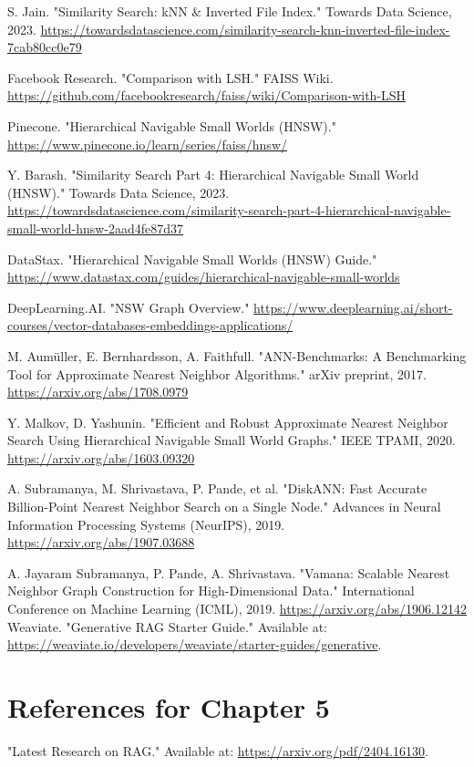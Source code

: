 \documentclass[12pt,a4paper,twoside,openright,justified]{book}
\begin{document}
\begin{thebibliography}{99}
S. Jain. "Similarity Search: kNN & Inverted File Index." Towards Data Science, 2023. \url{https://towardsdatascience.com/similarity-search-knn-inverted-file-index-7cab80cc0e79}

Facebook Research. "Comparison with LSH." FAISS Wiki. \url{https://github.com/facebookresearch/faiss/wiki/Comparison-with-LSH}

Pinecone. "Hierarchical Navigable Small Worlds (HNSW)." \url{https://www.pinecone.io/learn/series/faiss/hnsw/}

Y. Barash. "Similarity Search Part 4: Hierarchical Navigable Small World (HNSW)." Towards Data Science, 2023. \url{https://towardsdatascience.com/similarity-search-part-4-hierarchical-navigable-small-world-hnsw-2aad4fe87d37}

DataStax. "Hierarchical Navigable Small Worlds (HNSW) Guide." \url{https://www.datastax.com/guides/hierarchical-navigable-small-worlds}

DeepLearning.AI. "NSW Graph Overview." \url{https://www.deeplearning.ai/short-courses/vector-databases-embeddings-applications/}

M. Aumüller, E. Bernhardsson, A. Faithfull. "ANN-Benchmarks: A Benchmarking Tool for Approximate Nearest Neighbor Algorithms." arXiv preprint, 2017. \url{https://arxiv.org/abs/1708.0979}

Y. Malkov, D. Yashunin. "Efficient and Robust Approximate Nearest Neighbor Search Using Hierarchical Navigable Small World Graphs." IEEE TPAMI, 2020. \url{https://arxiv.org/abs/1603.09320}

A. Subramanya, M. Shrivastava, P. Pande, et al. "DiskANN: Fast Accurate Billion-Point Nearest Neighbor Search on a Single Node." Advances in Neural Information Processing Systems (NeurIPS), 2019. \url{https://arxiv.org/abs/1907.03688}

A. Jayaram Subramanya, P. Pande, A. Shrivastava. "Vamana: Scalable Nearest Neighbor Graph Construction for High-Dimensional Data." International Conference on Machine Learning (ICML), 2019. \url{https://arxiv.org/abs/1906.12142}
Weaviate. "Generative RAG Starter Guide." 
Available at: \url{https://weaviate.io/developers/weaviate/starter-guides/generative}.
\section*{References for Chapter 5}
"Latest Research on RAG." 
Available at: \url{https://arxiv.org/pdf/2404.16130}.


\end{thebibliography}
\end{document}
